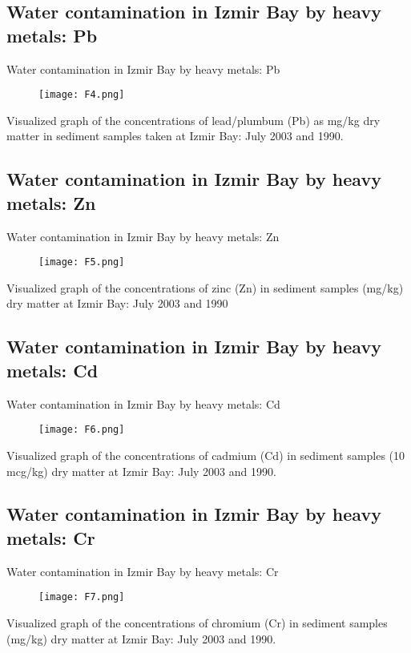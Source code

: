 \documentclass[pdflatex,compress,9pt,
	xcolor={dvipsnames,dvipsnames,svgnames,x11names,table},
	hyperref={colorlinks = true,breaklinks = true, urlcolor = NavyBlue, breaklinks = true}]{beamer}
\begin{document}
\subsection{Water contamination in Izmir Bay by heavy metals: Pb}
\begin{frame}{Water contamination in Izmir Bay by heavy metals: Pb}
\begin{figure}[H]
	\centering
		\texttt{[image: F4.png]}
\end{figure}
Visualized graph of the concentrations of lead/plumbum (Pb) as mg/kg dry matter in sediment samples taken at Izmir Bay: July 2003 and 1990.
\end{frame}

\subsection{Water contamination in Izmir Bay by heavy metals: Zn}
\begin{frame}{Water contamination in Izmir Bay by heavy metals: Zn}
\begin{figure}[H]
	\centering
		\texttt{[image: F5.png]}
\end{figure}
Visualized graph of the concentrations of zinc (Zn) in sediment samples (mg/kg) dry matter at Izmir Bay: July 2003 and 1990
\end{frame}

\subsection{Water contamination in Izmir Bay by heavy metals: Cd}
\begin{frame}{Water contamination in Izmir Bay by heavy metals: Cd}
\begin{figure}[H]
	\centering
		\texttt{[image: F6.png]}
\end{figure}
Visualized graph of the concentrations of cadmium (Cd) in sediment samples (10 mcg/kg) dry matter at Izmir Bay: July 2003 and 1990.
\end{frame}

\subsection{Water contamination in Izmir Bay by heavy metals: Cr}
\begin{frame}{Water contamination in Izmir Bay by heavy metals: Cr}
\begin{figure}[H]
	\centering
		\texttt{[image: F7.png]}
\end{figure}
Visualized graph of the concentrations of chromium (Cr) in sediment samples (mg/kg) dry matter at Izmir Bay: July 2003 and 1990.
\end{frame}
\end{document}
